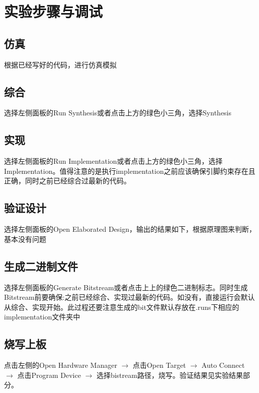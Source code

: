 
\section{实验步骤与调试}
\subsection{仿真} 根据已经写好的代码，进行仿真模拟\\

\subsection{综合} 选择左侧面板的Run Synthesis或者点击上方的绿色小三角，选择Synthesis
\subsection{实现} 选择左侧面板的Run Implementation或者点击上方的绿色小三角，选择Implementation。值得注意的是执行implementation之前应该确保引脚约束存在且正确，同时之前已经综合过最新的代码。
\subsection{验证设计} 选择左侧面板的Open Elaborated Design，输出的结果如下，根据原理图来判断，基本没有问题
\subsection{生成二进制文件} 选择左侧面板的Generate Bitstream或者点击上上的绿色二进制标志。同时生成Bitstream前要确保:之前已经综合、实现过最新的代码。如没有，直接运行会默认从综合、实现开始。此过程还要注意生成的bit文件默认存放在.runs下相应的implementation文件夹中
\subsection{烧写上板} 点击左侧的Open Hardware Manager $\rightarrow$ 点击Open Target $\rightarrow$ Auto Connect $\rightarrow$ 点击Program Device $\rightarrow$ 选择bistream路径，烧写。验证结果见实验结果部分。
